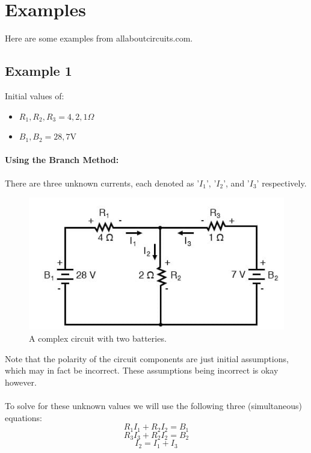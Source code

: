 \documentclass{article}
\begin{document}
	\section{Examples}
	Here are some examples from allaboutcircuits.com.
	\subsection{Example 1}
	Initial values of:
	\begin{itemize}
		\item $R_1, R_2, R_3 = 4, 2, 1 \Omega$
		\item $B_1, B_2 = 28, 7 \text{V}$
	\end{itemize}
	\paragraph[Branch]{Using the Branch Method:}
	There are three unknown currents, each denoted as '$I_1$', '$I_2$', and 
	'$I_3$' respectively.
	\begin{figure}[H]\label{fig:circuit}
		\caption{A complex circuit with two batteries.}
		\centering
		\includegraphics[width=0.75\linewidth,height=0.375\linewidth]{circuit-1}
	\end{figure}
	Note that the polarity of the circuit components are just initial 
	assumptions, which may in fact be incorrect.  These assumptions being 
	incorrect is okay however. \\ \\
	To solve for these unknown values we will use the following three 
	(simultaneous) equations:
	\begin{equation}\label{eq:series_1}
		R_1I_1 + R_2I_2 = B_1
	\end{equation}
	\begin{equation}\label{eq:series_2}
		R_3I_3 + R_2I_2 = B_2
	\end{equation}
	\begin{equation}\label{eq:cur_2-in-cur_1--cur_3}
		I_2 = I_1 + I_3
	\end{equation}
\end{document}
